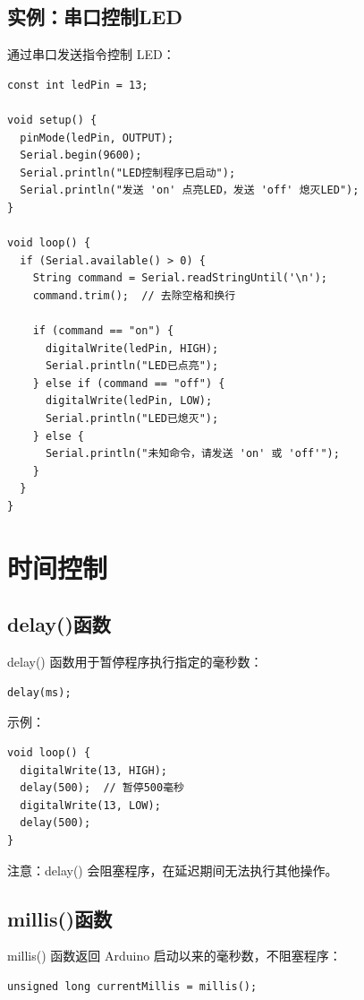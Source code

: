 \documentclass[12pt,UTF8]{ctexbook}
\begin{document}
\section{实例：串口控制LED}

通过串口发送指令控制 LED：

\begin{lstlisting}
const int ledPin = 13;

void setup() {
  pinMode(ledPin, OUTPUT);
  Serial.begin(9600);
  Serial.println("LED控制程序已启动");
  Serial.println("发送 'on' 点亮LED，发送 'off' 熄灭LED");
}

void loop() {
  if (Serial.available() > 0) {
    String command = Serial.readStringUntil('\n');
    command.trim();  // 去除空格和换行
    
    if (command == "on") {
      digitalWrite(ledPin, HIGH);
      Serial.println("LED已点亮");
    } else if (command == "off") {
      digitalWrite(ledPin, LOW);
      Serial.println("LED已熄灭");
    } else {
      Serial.println("未知命令，请发送 'on' 或 'off'");
    }
  }
}
\end{lstlisting}

\chapter{时间控制}

\section{delay()函数}

delay() 函数用于暂停程序执行指定的毫秒数：

\begin{lstlisting}
delay(ms);
\end{lstlisting}

示例：
\begin{lstlisting}
void loop() {
  digitalWrite(13, HIGH);
  delay(500);  // 暂停500毫秒
  digitalWrite(13, LOW);
  delay(500);
}
\end{lstlisting}

注意：delay() 会阻塞程序，在延迟期间无法执行其他操作。

\section{millis()函数}

millis() 函数返回 Arduino 启动以来的毫秒数，不阻塞程序：

\begin{lstlisting}
unsigned long currentMillis = millis();
\end{lstlisting}
\end{document}
